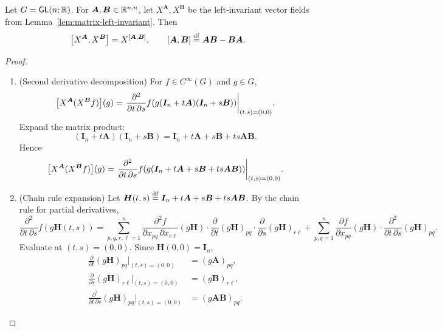 \documentclass[11pt,reqno]{amsart}
\begin{document}
\begin{lemma}\label{lem:matrix-commutator}
  Let $G=\operatorname{\mathsf{GL}}(n;\mathbb{R})$.  For $\bm A,\bm B\in\mathbb{R}^{n,n}$,
  let $X^{\bm A},X^{\bm B}$ be the left‑invariant vector fields from
  Lemma~\ref{lem:matrix-left-invariant}.  Then
  \[
    \SqBr{X^{\bm A}, X^{\bm B}} = X^{\SqBr{\bm A,\bm B}},
    \qquad
    \SqBr{\bm A,\bm B}\df\bm A\bm B - \bm B\bm A.
  \]
\end{lemma}
\begin{proof}
  \begin{enumerate}
  \item (Second derivative decomposition)
  For $f\in C^\infty(G)$ and $g\in G$,
  \[
    \FUNC{X^{\bm A}(X^{\bm B}f)}{g}
    =\eval{\frac{\partial^2}{\partial t\,\partial s}
      f\Br{g(\bm I_n + t\bm A)(\bm I_n + s\bm B)}}_{(t,s)=(0,0)}.
  \]
  Expand the matrix product:
  \[
    (\bm I_n + t\bm A)(\bm I_n + s\bm B)
    =\bm I_n + t\bm A + s\bm B + ts\bm A\bm B.
  \]
  Hence
  \[
    \FUNC{X^{\bm A}(X^{\bm B}f)}{g}
    =\eval{\frac{\partial^2}{\partial t\,\partial s}
      f\Br{g\Br{\bm I_n + t\bm A + s\bm B + ts\bm A\bm B}}}_{(t,s)=(0,0)}.
  \]

  \item (Chain rule expansion)
  Let $\bm H(t,s)\stackrel{\mathrm{df}}{=}\bm I_n + t\bm A + s\bm B + ts\bm A\bm B$.
  By the chain rule for partial derivatives,
  \[
    \frac{\partial^2}{\partial t\,\partial s}
    f(g\bm H(t,s))
    =\sum_{p,q,r,\ell=1}^n
    \frac{\partial^2 f}{\partial x_{pq}\,\partial x_{r\ell}}(g\bm H)
    \cdot\frac{\partial}{\partial t}(g\bm H)_{pq}
    \cdot\frac{\partial}{\partial s}(g\bm H)_{r\ell}
    +\sum_{p,q=1}^n
    \frac{\partial f}{\partial x_{pq}}(g\bm H)
    \cdot\frac{\partial^2}{\partial t\,\partial s}(g\bm H)_{pq}.
  \]
  Evaluate at $(t,s)=(0,0)$.  Since $\bm H(0,0)=\bm I_n$,
  \[
    \begin{aligned}
    \frac{\partial}{\partial t}(g\bm H)_{pq}\Big|_{(t,s)=(0,0)} &= (g\bm A)_{pq}, \\
    \frac{\partial}{\partial s}(g\bm H)_{r\ell}\Big|_{(t,s)=(0,0)} &= (g\bm B)_{r\ell}, \\
    \frac{\partial^2}{\partial t\,\partial s}(g\bm H)_{pq}\Big|_{(t,s)=(0,0)} &= (g\bm A\bm B)_{pq}.
    \end{aligned}
  \]


\end{enumerate}
\end{proof}
\end{document}
